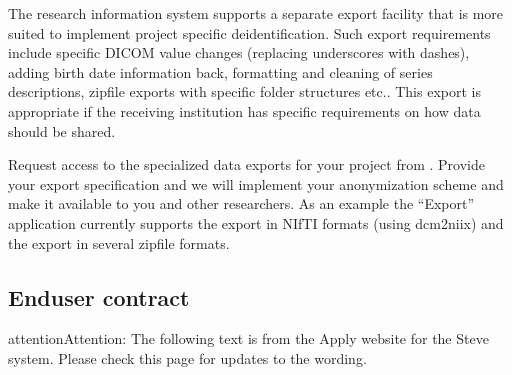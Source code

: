 \documentclass[letterpaper,10pt,english]{sphinxmanual}
\begin{document}
\sphinxAtStartPar
{}

\sphinxAtStartPar
The research information system supports a separate export facility that is more suited to implement project specific de\sphinxhyphen{}identification. Such export requirements include specific DICOM value changes (replacing underscores with dashes), adding birth date information back, formatting and cleaning of series descriptions, zip\sphinxhyphen{}file exports with specific folder structures etc.. This export is appropriate if the receiving institution has specific requirements on how data should be shared.

\sphinxAtStartPar
Request access to the specialized data exports for your project from . Provide your export specification and we will implement your anonymization scheme and make it available to you and other researchers. As an example the “Export” application currently supports the export in NIfTI formats (using dcm2niix) and the export in several zip\sphinxhyphen{}file formats.


\subsection{End\sphinxhyphen{}user contract}
\label{\detokenize{EndUser/index:end-user-contract}}
\begin{sphinxadmonition}{attention}{Attention:}
\sphinxAtStartPar
The following text is from the Apply website for the Steve system. Please check this page for updates to the wording.
\end{sphinxadmonition}
\end{document}
